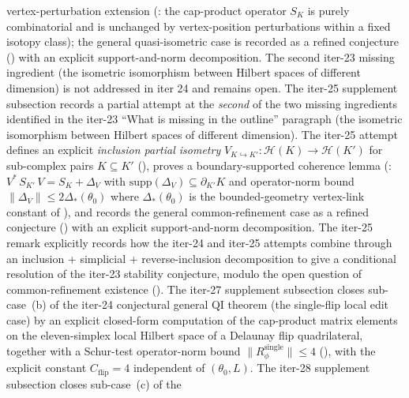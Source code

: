 \documentclass[11pt]{article}
\numberwithin{equation}{section}
\theoremstyle{definition}
\theoremstyle{remark}
\newcommand{\Hil}{\mathcal{H}}
\begin{document}
\begin{itemize}[leftmargin=2em]
vertex-perturbation extension (:
the cap-product operator \(S_K\) is purely combinatorial and is
unchanged by vertex-position perturbations within a fixed isotopy
class); the general quasi-isometric case is recorded as a refined
conjecture () with an explicit
support-and-norm decomposition. The second iter-23 missing ingredient
(the isometric isomorphism between Hilbert spaces of different
dimension) is not addressed in iter 24 and remains open. The iter-25
supplement subsection
 records a partial attempt
at the \emph{second} of the two missing ingredients identified in
the iter-23 ``What is missing in the outline'' paragraph (the
isometric isomorphism between Hilbert spaces of different dimension).
The iter-25 attempt defines an explicit \emph{inclusion partial
isometry} \(V_{K\hookrightarrow K'}:\Hil(K)\to\Hil(K')\) for
sub-complex pairs \(K\subseteq K'\)
(), proves a
boundary-supported coherence lemma
(:
\(V^*\,S_{K'}\,V=S_K+\Delta_V\) with
\(\mathrm{supp}(\Delta_V)\subseteq\partial_{K'}K\) and operator-norm
bound \(\|\Delta_V\|\le 2\Delta_*(\theta_0)\) where
\(\Delta_*(\theta_0)\) is the bounded-geometry vertex-link constant
of ), and records the general
common-refinement case as a refined conjecture
() with an explicit
support-and-norm decomposition. The iter-25 remark
 explicitly records how the
iter-24 and iter-25 attempts combine through an
inclusion + simplicial + reverse-inclusion decomposition to give a
conditional resolution of the iter-23 stability conjecture, modulo
the open question of common-refinement existence
(). The iter-27
supplement subsection
 closes sub-case~(b)
of the iter-24 conjectural general QI theorem
 (the single-flip local
edit case) by an explicit closed-form computation of the
cap-product matrix elements on the eleven-simplex local Hilbert
space of a Delaunay flip quadrilateral, together with a Schur-test
operator-norm bound
\(\|R_\phi^{\mathrm{single}}\|\le 4\)
(), with the explicit
constant \(C_{\mathrm{flip}}=4\) independent of
\((\theta_0,L)\). The iter-28 supplement subsection
 closes sub-case~(c) of the

\end{itemize}
\end{document}

